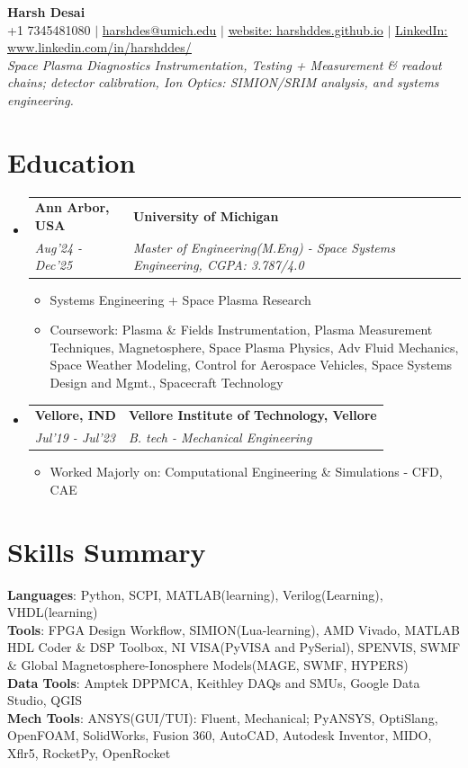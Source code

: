 \documentclass[letterpaper,11pt]{article}
\makeatletter
\newcommand{\resumeItem}[1]{
\item\small{#1}
}
\newlength{\leftcolwidth}
\newlength{\colgap}
\newlength{\rightcolindent}
\newcommand{\resumeSubheading}[4]{%
  \vspace{0pt}
\item[]
  \begin{tabularx}{\textwidth}{@{}>{\raggedleft\arraybackslash}p{\leftcolwidth}@{\hspace{\colgap}}>{\raggedright\arraybackslash}X@{}}
    \textbf{\small #2} & \textbf{#1} \\
    \textit{\small #4} & \textit{\small #3} \\
  \end{tabularx}\vspace{0pt}
}
\newcommand{\resumeItemListStart}{%
  \begin{itemize}[leftmargin=\rightcolindent, label={}, itemindent=0pt,
    itemsep=0.6mm, parsep=0pt, topsep=1pt, partopsep=0pt]}
\renewcommand{\resumeItem}[1]{
  \item\small{#1}}
\newcommand{\resumeSubHeadingListStart}{
    \begin{itemize}[leftmargin=0pt, label={}, itemsep=3pt, parsep=0pt, topsep=0pt, partopsep=0pt]}
\newcommand{\resumeSubHeadingListEnd}{
      \end{itemize}}
\newcommand{\resumeItemListEnd}{
  \end{itemize}}
\makeatother
\begin{document}
\begin{center}
  \textbf{\Huge Harsh Desai} \\ \vspace{4pt}
  \small +1 7345481080 $|$ \href{mailto:harshdes@umich.edu}{harshdes@umich.edu} $|$ \href{https://harshddes.github.io/}{\underline{website: harshddes.github.io}} $|$
  \href{https://www.linkedin.com/in/harshddes}{\underline{LinkedIn: www.linkedin.com/in/harshddes/}} \\
  \vspace{2pt}
  \small \textit{Space Plasma Diagnostics Instrumentation, Testing + Measurement \& readout chains; detector calibration, Ion Optics: SIMION/SRIM analysis, and systems engineering.}
\end{center}

\section{Education}
\resumeSubHeadingListStart
\resumeSubheading
{University of Michigan}{Ann Arbor, USA}
{Master of Engineering(M.Eng) - Space Systems Engineering, CGPA: 3.787/4.0}{Aug'24 - Dec'25}
\resumeItemListStart
\resumeItem{Systems Engineering + Space Plasma Research}
\resumeItem{Coursework: Plasma \& Fields Instrumentation, Plasma Measurement Techniques,  Magnetosphere, Space Plasma Physics, Adv Fluid Mechanics, Space Weather Modeling, Control for Aerospace Vehicles,  Space Systems Design and Mgmt., Spacecraft Technology}
\resumeItemListEnd
\resumeSubheading
{Vellore Institute of Technology, Vellore}{Vellore, IND}
{B. tech - Mechanical Engineering}{Jul'19 - Jul'23}
\resumeItemListStart
\resumeItem{Worked Majorly on: Computational Engineering \& Simulations - CFD, CAE }
\resumeItemListEnd
\resumeSubHeadingListEnd

\section{Skills Summary}
\begin{itemize}[leftmargin=0pt, label={}, itemsep=0pt, parsep=0pt, topsep=0pt, partopsep=0pt]
    \small{
    \item{
        \textbf{Languages}{: Python, SCPI, MATLAB(learning), Verilog(Learning), VHDL(learning)} \\
        \textbf{Tools}{: FPGA Design Workflow, SIMION(Lua-learning), AMD Vivado, MATLAB HDL Coder \& DSP Toolbox, NI VISA(PyVISA and PySerial), SPENVIS, SWMF \& Global Magnetosphere-Ionosphere Models(MAGE, SWMF, HYPERS)\\
          \textbf{Data Tools}{: Amptek DPPMCA, Keithley DAQs and SMUs, Google Data Studio, QGIS} \\
          \textbf{Mech Tools}{: ANSYS(GUI/TUI): Fluent, Mechanical; PyANSYS, OptiSlang, OpenFOAM, SolidWorks, Fusion 360, AutoCAD, Autodesk Inventor, MIDO, Xflr5, RocketPy, OpenRocket}
    }}}
\end{itemize}
\end{document}
